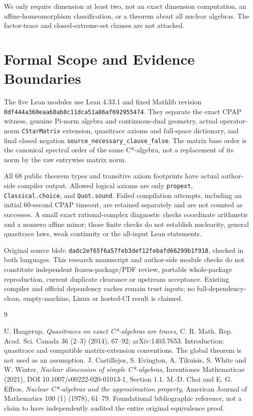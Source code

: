 \documentclass[11pt]{article}
\begin{document}
We only require dimension at least two, not an exact dimension computation,
an affine-homeomorphism classification, or a theorem about all nuclear
algebras. The factor-trace and closed-extreme-set clauses are not attacked.

\section{Formal Scope and Evidence Boundaries}
The five Lean modules use Lean 4.33.1 and fixed Mathlib revision
\texttt{0df444a360eaa60ab8c11dca51a86af692955474}. They separate the exact
CPAP witness, genuine Pi-norm algebra and continuous-dual geometry, actual
operator-norm \texttt{CStarMatrix} extension, quasitrace axioms and full-space
dictionary, and final closed negation
\texttt{source\_necessary\_clause\_false}. The matrix base order is the
canonical spectral order of the same C*-algebra, not a replacement of its
norm by the raw entrywise matrix norm.

All 68 public theorem types and transitive axiom footprints have actual
author-side compiler output. Allowed logical axioms are only
\texttt{propext}, \texttt{Classical.choice}, and \texttt{Quot.sound}.
Failed compilation attempts, including an initial 60-second CPAP timeout,
are retained separately and are not counted as successes. A small exact
rational-complex diagnostic checks coordinate arithmetic and a nonzero
affine minor; those finite checks do not establish nuclearity, general
quasitrace laws, weak continuity or the all-input Lean statements.

Original source blob:
\texttt{dadc2ef65f6a57feb3def12febafd66299b1f918}, checked in both languages.
This research manuscript and author-side module checks do not constitute
independent frozen-package/PDF review, portable whole-package reproduction,
current duplicate clearance or upstream acceptance. Existing compiler and
official dependency caches remain trust inputs; no full-dependency-clean,
empty-machine, Linux or hosted-CI result is claimed.

\begin{thebibliography}{9}
\raggedright
{} U. Haagerup,
\emph{Quasitraces on exact C*-algebras are traces},
C. R. Math. Rep. Acad. Sci. Canada 36 (2--3) (2014), 67--92;
arXiv:1403.7653. Introduction: quasitrace and compatible matrix-extension
conventions. The global theorem is not used as an assumption.
 J. Castillejos, S. Evington, A. Tikuisis, S. White and W. Winter,
\emph{Nuclear dimension of simple C*-algebras}, Inventiones Mathematicae
(2021), DOI 10.1007/s00222-020-01013-1, Section 1.1.
 M.-D. Choi and E. G. Effros,
\emph{Nuclear C*-algebras and the approximation property},
American Journal of Mathematics 100 (1) (1978), 61--79.
Foundational bibliographic reference, not a claim to have independently
audited the entire original equivalence proof.
\end{thebibliography}
\end{document}
